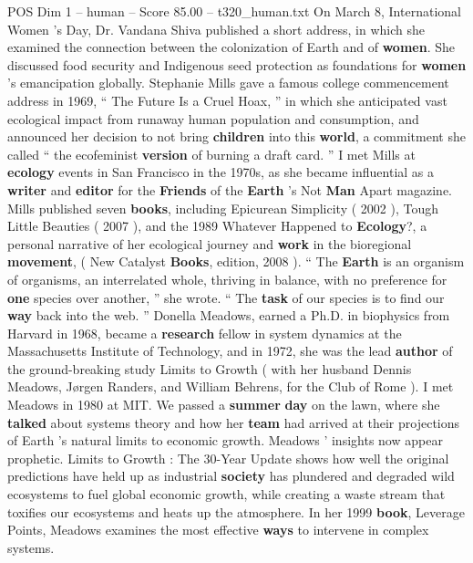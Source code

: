 \begin{textsample}{POS Dim 1 – human – Score 85.00 – t320\_human.txt}  \label{ex:f1_pos_010}
On March 8, International Women ’s Day, Dr.
Vandana Shiva published a short address, in which she examined the connection between the colonization of Earth and of \textbf{women}.
She discussed food security and Indigenous seed protection as foundations for \textbf{women} ’s emancipation globally.
Stephanie Mills gave a famous college commencement address in 1969, “ The Future Is a Cruel Hoax, ” in which she anticipated vast ecological impact from runaway human population and consumption, and announced her decision to not bring \textbf{children} into this \textbf{world}, a commitment she called “ the ecofeminist \textbf{version} of burning a draft card. ” I met Mills at \textbf{ecology} events in San Francisco in the 1970s, as she became influential as a \textbf{writer} and \textbf{editor} for the \textbf{Friends} of the \textbf{Earth} ’s Not \textbf{Man} Apart magazine.
Mills published seven \textbf{books}, including Epicurean Simplicity ( 2002 ), Tough Little Beauties ( 2007 ), and the 1989 Whatever Happened to \textbf{Ecology}?, a personal narrative of her ecological journey and \textbf{work} in the bioregional \textbf{movement}, ( New Catalyst \textbf{Books}, edition, 2008 ). “ The \textbf{Earth} is an organism of organisms, an interrelated whole, thriving in balance, with no preference for \textbf{one} species over another, ” she wrote. “ The \textbf{task} of our species is to find our \textbf{way} back into the web. ” Donella Meadows, earned a Ph.D. in biophysics from Harvard in 1968, became a \textbf{research} fellow in system dynamics at the Massachusetts Institute of Technology, and in 1972, she was the lead \textbf{author} of the ground-breaking study Limits to Growth ( with her husband Dennis Meadows, Jørgen Randers, and William Behrens, for the Club of Rome ).
I met Meadows in 1980 at MIT.
We passed a \textbf{summer} \textbf{day} on the lawn, where she \textbf{talked} about systems theory and how her \textbf{team} had arrived at their projections of Earth ’s natural limits to economic growth.
Meadows ’ insights now appear prophetic.
Limits to Growth : The 30-Year Update shows how well the original predictions have held up as industrial \textbf{society} has plundered and degraded wild ecosystems to fuel global economic growth, while creating a waste stream that toxifies our ecosystems and heats up the atmosphere.
In her 1999 \textbf{book}, Leverage Points, Meadows examines the most effective \textbf{ways} to intervene in complex systems.

\end{textsample}

